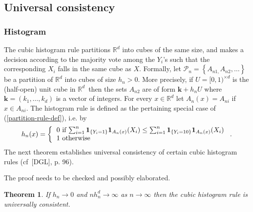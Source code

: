 \documentclass[11pt,twoside]{article}%
\theoremstyle{change}
\newtheorem{theorem}{Theorem}[section]
\newenvironment{quote-env}{\begin{quote}\sffamily }{\end{quote}}
\newenvironment{mycomments-env}[1][Mycomments]{\textbf{#1.} \begin{quote-env} }{ \end{quote-env}  \ \rule{0.5em}{0.5em}}
\begin{document}
\subsection{Universal consistency}

\subsubsection{Histogram\label{subsec-histogr}}

The cubic histogram rule partitions $\mathbb{R}^{d}$ into cubes of the same
size, and makes a decision according to the majority vote among the $Y_{i}$'s
such that the corresponding $X_{i}$ falls in the same cube as $X$. Formally,
let $\mathcal{P}_{n}=\left\{  A_{n1,}A_{n2},\ldots\right\}  $ be a partition
of $\mathbb{R}^{d}$ into cubes of size $h_{n}>0.$ More precisely, if
$U=[0,1)^{\times d}$ is the (half-open) unit cube in $\mathbb{R}^{d}$\ then
the sets $A_{n2}$ are of form $\mathbf{k}+h_{n}U$ where $\mathbf{k}%
=(k_{1},\ldots,k_{d})$ is a vector of integers. For every $x\in\mathbb{R}^{d}$
let $A_{n}(x)=A_{ni}$ if $x\in A_{ni}$. The histogram rule is defined as the
pertaining special case of (\ref{partition-rule-def}), i.e. by
\[
h_{n}(x)=\left\{
\begin{tabular}
[c]{l}%
$0$ if $\sum_{i=1}^{n}\mathbf{1}_{\left\{  Y_{i}=1\right\}  }\mathbf{1}%
_{A_{n}(x)}(X_{i})\leq\sum_{i=1}^{n}\mathbf{1}_{\left\{  Y_{i}=10\right\}
}\mathbf{1}_{A_{n}(x)}(X_{i})$\\
$1$ otherwise
\end{tabular}
\right.  .
\]
The next theorem establishes universal consistency of certain cubic histogram
rules (cf\ [DGL], p. 96).%

\begin{mycomments}%


\begin{mycomments-env}
The proof needs to be checked and possibly elaborated.
\end{mycomments-env}%

\end{mycomments}%


\begin{theorem}
\label{theor-consist-histogr}If $h_{n}\rightarrow0$ and $nh_{n}^{d}%
\rightarrow\infty$ as $n\rightarrow\infty$ then the cubic histogram rule is
universally consistent.
\end{theorem}
\end{document}
